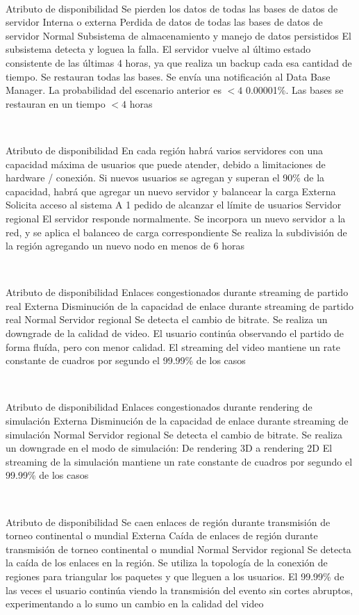 ~

\escenario
{Atributo de disponibilidad}
{Se pierden los datos de todas las bases de datos de servidor}
{Interna o externa}
{Perdida de datos de todas las bases de datos de servidor}
{Normal}
{Subsistema de almacenamiento y manejo de datos persistidos}
{El subsistema detecta y loguea la falla. El servidor vuelve al último estado consistente de las últimas 4 horas, ya que realiza un backup cada esa cantidad de tiempo. Se restauran todas las bases. Se envía una notificación al Data Base Manager.}
{La probabilidad del escenario anterior es $< 4$ 0.00001\%. Las bases se restauran en un tiempo $< 4$ horas}

~

\escenario
{Atributo de disponibilidad}
{En cada región habrá varios servidores con una capacidad máxima de usuarios que puede atender, debido a limitaciones de hardware / conexión. Si nuevos usuarios se agregan y superan el 90\% de la capacidad, habrá que agregar un nuevo servidor y balancear la carga}
{Externa}
{Solicita acceso al sistema}
{A 1 pedido de alcanzar el límite de usuarios}
{Servidor regional}
{El servidor responde normalmente. Se incorpora un nuevo servidor a la red, y se aplica el balanceo de carga correspondiente}
{Se realiza la subdivisión de la región agregando un nuevo nodo en menos de 6 horas}

~

\escenario
{Atributo de disponibilidad}
{Enlaces congestionados durante streaming de partido real}
{Externa}
{Disminución de la capacidad de enlace durante streaming de partido real}
{Normal}
{Servidor regional}
{Se detecta el cambio de bitrate. Se realiza un downgrade de la calidad de video. El usuario continúa observando el partido de forma fluída, pero con menor calidad.}
{El streaming del video mantiene un rate constante de cuadros por segundo el 99.99\% de los casos}

~

\escenario
{Atributo de disponibilidad}
{Enlaces congestionados durante rendering de simulación}
{Externa}
{Disminución de la capacidad de enlace durante streaming de simulación}
{Normal}
{Servidor regional}
{Se detecta el cambio de bitrate. Se realiza un downgrade en el modo de simulación: De rendering 3D a rendering 2D}
{El streaming de la simulación mantiene un rate constante de cuadros por segundo el 99.99\% de los casos}

~

\escenario
{Atributo de disponibilidad}
{Se caen enlaces de región durante transmisión de torneo continental o mundial}
{Externa}
{Caída de enlaces de región durante transmisión de torneo continental o mundial}
{Normal}
{Servidor regional}
{Se detecta la caída de los enlaces en la región. Se utiliza la topología de la conexión de regiones para triangular los paquetes y que lleguen a los usuarios.}
{El 99.99\% de las veces el usuario continúa viendo la transmisión del evento sin cortes abruptos, experimentando a lo sumo un cambio en la calidad del video}

